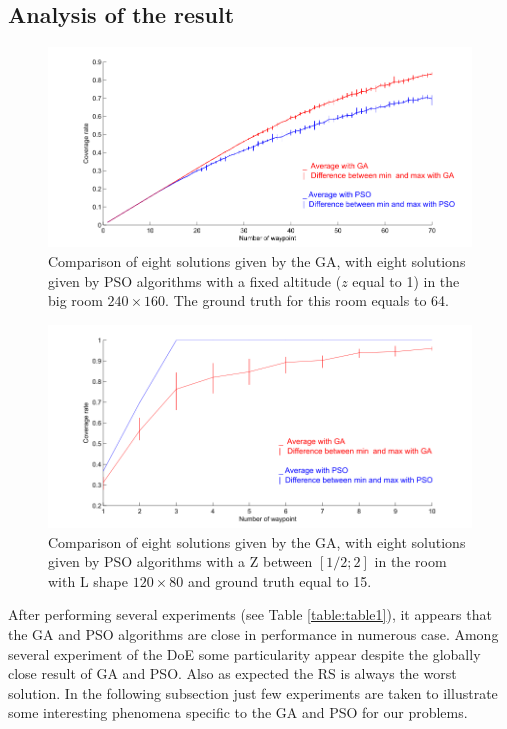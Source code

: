 \subsection{ Analysis of the result }

\begin{figure}[!]
  \includegraphics[width=\linewidth]{img/fig8.png}
  \caption{ Comparison of eight solutions given by the GA, with eight solutions given by PSO algorithms with a fixed altitude ($z$ equal to 1) in the big room $240\times160$. The ground truth for this room equals to 64.}
  \label{fig:bigRz1}
   \endminipage\hfill
\end{figure}
%
%
\begin{figure}[!]
  \includegraphics[width=\linewidth]{img/fig9.png}
  \caption{Comparison of eight solutions given by the GA, with eight solutions given by PSO algorithms with a Z between $[1/2; 2]$ in the room with L shape $120\times80$ and ground truth equal to 15.}\label{fig:RLz2}
   \endminipage\hfill
\end{figure}
After performing several experiments (see Table \ref{table:table1}), it appears that the GA and PSO algorithms are close in performance in numerous case. Among several experiment of the DoE some particularity appear despite the globally close result of GA and PSO. Also as expected the RS is always the worst solution.
 In the following subsection just few experiments are taken to illustrate some interesting phenomena specific to the GA and PSO for our problems.

